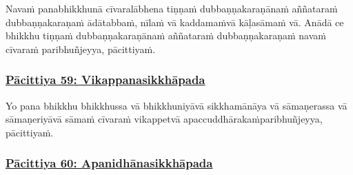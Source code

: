 Navaṁ pana\makeatletter\hyperlink{endnote339-appendix}\makeatother \thinspace bhikkhunā cīvaralābhena tiṇṇaṁ dubbaṇṇakaraṇānaṁ aññataraṁ dubbaṇṇakaraṇaṁ ādātabbaṁ, nīlaṁ vā kaddamaṁ\makeatletter\hyperlink{endnote339-appendix}\makeatother \thinspace vā kāḷasāmaṁ vā. Anādā ce bhikkhu tiṇṇaṁ dubbaṇṇakaraṇānaṁ aññataraṁ dubbaṇṇakaraṇaṁ navaṁ cīvaraṁ paribhuñjeyya, pācittiyaṁ.



\subsubsection*{\hyperref[exp59]{Pācittiya 59: Vikappanasikkhāpada}}
\label{pac59}
Yo pana bhikkhu bhikkhussa vā bhikkhuniyā\makeatletter\hyperlink{endnote340-appendix}\makeatother \thinspace vā sikkhamānāya vā sāmaṇerassa vā sāmaṇeriyā\makeatletter\hyperlink{endnote341-appendix}\makeatother \thinspace vā sāmaṁ cīvaraṁ vikappetvā apaccuddhārakaṁ\makeatletter\hyperlink{endnote342-appendix}\makeatother \thinspace paribhuñjeyya, pācittiyaṁ.



\subsubsection*{\hyperref[exp60]{Pācittiya 60: Apanidhānasikkhāpada}}
\label{pac60}

